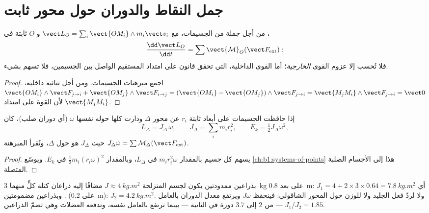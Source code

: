 \section{جمل النقاط والدوران حول محور ثابت}

\begin{theorem}\label{thm:b1:angular-momentum:system}
من أجل جملة من الجسيمات، مع $\vect L_O = \sum_i\vect{OM_i}\wedge m_i\vect v_i$
و $O$ ثابتة في ،
\[
\frac{\dd\vect L_O}{\dd t} = \sum\vect{\mathcal M}_O(\vect F_{\mathrm{ext}}):
\]
فلا تُحسب إلا عزوم القوى \emph{الخارجية}؛ أما القوى الداخلية،
التي تحقق قانون  على امتداد المستقيم الواصل بين
الجسيمين، فلا تسهم بشيء.
\end{theorem}

\begin{proof}
اجمع مبرهنات الجسيمات. ومن أجل ثنائية داخلية، $\vect{OM_i}\wedge\vect F_{j\to i}
+ \vect{OM_j}\wedge\vect F_{i\to j} = (\vect{OM_i} - \vect{OM_j})\wedge\vect F_{j\to i}
= \vect{M_jM_i}\wedge\vect F_{j\to i} = \vect 0$ لأن القوة على امتداد
$\vect{M_jM_i}$.
\end{proof}

\begin{proposition}\label{prop:b1:angular-momentum:inertia}
إذا حافظت الجسيمات على أبعاد ثابتة $r_i$ عن محور $\Delta$ ودارت
كلها حوله  نفسها $\omega$ (أي دوران صلب)، كان
\[
L_\Delta = J_\Delta\,\omega, \qquad J_\Delta = \sum_i m_ir_i^2, \qquad
E_k = \tfrac12 J_\Delta\omega^2,
\]
حيث $J_\Delta$ هو \emph{} حول $\Delta$، وتُقرأ
المبرهنة $J_\Delta\dot\omega = \sum\mathcal M_\Delta(\vect F_{\mathrm{ext}})$.
\end{proposition}

\begin{proof}
يسهم كل جسيم بالمقدار $m_ir_i^2\omega$ في $L_\Delta$، وبالمقدار
$\tfrac12 m_i(r_i\omega)^2$ في $E_k$. ويوسّع \cref{ch:b1:systems-of-points}
هذا إلى الأجسام الصلبة المتصلة.
\end{proof}

\begin{example}[المتزلجة]\label{ex:b1:angular-momentum:skater}
بذراعين ممدودتين يكون لجسم المتزلجة $J \approx \qty{4}{kg.m^2}$ مضافًا إليه ذراعان
كتلة كلٍّ منهما \qty{3}{kg} على بعد \qty{0.8}{m}: أي $J_1 = 4 + 2 \times 3 \times 0.64 =
\qty{7.8}{kg.m^2}$. وبذراعين مضمومتين (على \qty{0.2}{m}): $J_2 = \qty{4.2}{kg.m^2}$.
ولا  لردّ فعل الجليد ولا للوزن حول المحور
الشاقولي: فينحفظ $J\omega$ ويرتفع معدل الدوران بالعامل $J_1/J_2 = 1.85$
--- من $2$ إلى $3.7$ دورة في الثانية --- بينما ترتفع 
بالعامل نفسه، وتدفعه العضلات وهي تضمّ الذراعين.
\end{example}

